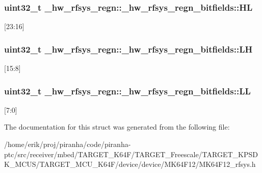 \subsubsection[{\texorpdfstring{HL}{HL}}]{\setlength{\rightskip}{0pt plus 5cm}uint32\+\_\+t \+\_\+hw\+\_\+rfsys\+\_\+regn\+::\+\_\+hw\+\_\+rfsys\+\_\+regn\+\_\+bitfields\+::\+HL}\hypertarget{struct__hw__rfsys__regn_1_1__hw__rfsys__regn__bitfields_ad1ad8c3b3014ab1c20deaadd69283a6a}{}\label{struct__hw__rfsys__regn_1_1__hw__rfsys__regn__bitfields_ad1ad8c3b3014ab1c20deaadd69283a6a}
\mbox{[}23\+:16\mbox{]} 
\subsubsection[{\texorpdfstring{LH}{LH}}]{\setlength{\rightskip}{0pt plus 5cm}uint32\+\_\+t \+\_\+hw\+\_\+rfsys\+\_\+regn\+::\+\_\+hw\+\_\+rfsys\+\_\+regn\+\_\+bitfields\+::\+LH}\hypertarget{struct__hw__rfsys__regn_1_1__hw__rfsys__regn__bitfields_a66e024bee6a0e8aafa367974c69092a9}{}\label{struct__hw__rfsys__regn_1_1__hw__rfsys__regn__bitfields_a66e024bee6a0e8aafa367974c69092a9}
\mbox{[}15\+:8\mbox{]} 
\subsubsection[{\texorpdfstring{LL}{LL}}]{\setlength{\rightskip}{0pt plus 5cm}uint32\+\_\+t \+\_\+hw\+\_\+rfsys\+\_\+regn\+::\+\_\+hw\+\_\+rfsys\+\_\+regn\+\_\+bitfields\+::\+LL}\hypertarget{struct__hw__rfsys__regn_1_1__hw__rfsys__regn__bitfields_ac5f9d5372f5c7e1ed06471f870e48ce8}{}\label{struct__hw__rfsys__regn_1_1__hw__rfsys__regn__bitfields_ac5f9d5372f5c7e1ed06471f870e48ce8}
\mbox{[}7\+:0\mbox{]} 

The documentation for this struct was generated from the following file\+:\begin{DoxyCompactItemize}
\item 
/home/erik/proj/piranha/code/piranha-\/ptc/src/receiver/mbed/\+T\+A\+R\+G\+E\+T\+\_\+\+K64\+F/\+T\+A\+R\+G\+E\+T\+\_\+\+Freescale/\+T\+A\+R\+G\+E\+T\+\_\+\+K\+P\+S\+D\+K\+\_\+\+M\+C\+U\+S/\+T\+A\+R\+G\+E\+T\+\_\+\+M\+C\+U\+\_\+\+K64\+F/device/device/\+M\+K64\+F12/M\+K64\+F12\+\_\+rfsys.\+h\end{DoxyCompactItemize}
